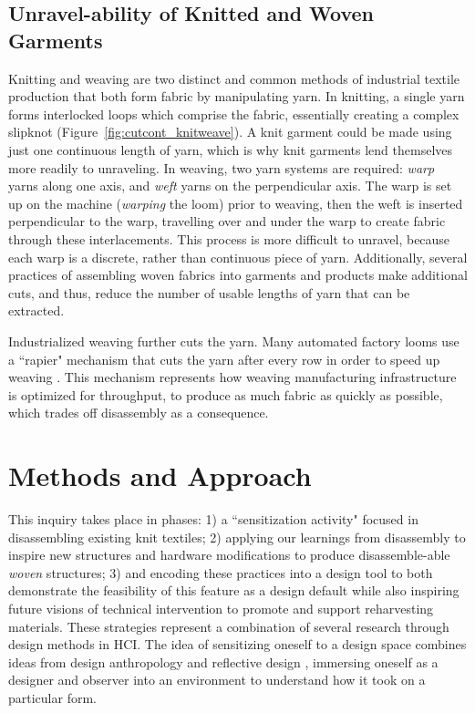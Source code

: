 \subsection{Unravel-ability of Knitted and Woven Garments}

Knitting and weaving are two distinct and common methods of industrial textile production that both form fabric by manipulating yarn. In knitting, a single yarn forms interlocked loops which comprise the fabric, essentially creating a complex slipknot (Figure~\ref{fig:cutcont_knitweave}). A knit garment could be made using just one continuous length of yarn, which is why knit garments lend themselves more readily to unraveling. In weaving, two yarn systems are required: \emph{warp} yarns along one axis, and \emph{weft} yarns on the perpendicular axis. The warp is set up on the machine (\emph{warping} the loom) prior to weaving, then the weft is inserted perpendicular to the warp, travelling over and under the warp to create fabric through these interlacements. This process is more difficult to unravel, because each warp is a discrete, rather than continuous piece of yarn. Additionally, several practices of assembling woven fabrics into garments and products make additional cuts, and thus, reduce the number of usable lengths of yarn that can be extracted.
 
Industrialized weaving further cuts the yarn. Many automated factory looms use a ``rapier" mechanism that cuts the yarn after every row in order to speed up weaving \cite{engineers_complete_2017}. This mechanism represents how weaving manufacturing infrastructure is optimized for throughput, to produce as much fabric as quickly as possible, which trades off disassembly as a consequence.


\section{Methods and Approach}

This inquiry takes place in phases: 1) a ``sensitization activity" focused in disassembling existing knit textiles; 2) applying our learnings from disassembly to inspire new structures and hardware modifications to produce disassemble-able \textit{woven} structures; 3) and encoding these practices into a design tool to both demonstrate the feasibility of this feature as a design default while also inspiring future visions of technical intervention to promote and support reharvesting materials. These strategies represent a combination of several research through design methods in HCI. The idea of sensitizing oneself to a design space combines ideas from design anthropology \cite{smith_design_2016} and reflective design \cite{sengers_reflective_2005}, immersing oneself as a designer and observer into an environment to understand how it took on a particular form.

